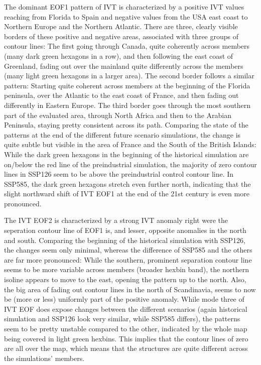 The dominant EOF1 pattern of IVT is characterized by a positive IVT values reaching from Florida to Spain and negative values from the USA east coast to Northern Europe and the Northern Atlantic. 
There are three, clearly visible borders of these positive and negative areas, associated with three groups of contour lines: The first going through Canada, quite coherently across members (many dark green hexagons in a row), and then following the east coast of Greenland, fading out over the mainland quite differently across the members (many light green hexagons in a larger area). 
The second border follows a similar pattern: Starting quite coherent across members at the beginning of the Florida peninsula, over the Atlantic to the east coast of France, and then fading out differently in Eastern Europe. 
The third border goes through the most southern part of the evaluated area, through North Africa and then to the Arabian Peninsula, staying pretty consistent across its path. 
Comparing the state of the patterns at the end of the different future scenario simulations, the change is quite subtle but visible in the area of France and the South of the British Islands:
While the dark green hexagons in the beginning of the historical simulation are on/below the red line of the preindustrial simulation, the majority of zero contour lines in SSP126 seem to be above the preindustrial control contour line. 
In SSP585, the dark green hexagons stretch even further north, indicating that the slight northward shift of IVT EOF1 at the end of the 21st century is even more pronounced. 

The IVT EOF2 is characterized by a strong IVT anomaly right were the seperation contour line of EOF1 is, and lesser, opposite anomalies in the north and south. 
Comparing the beginning of the historical simulation with SSP126, the changes seem only minimal, whereas the difference of SSP585 and the others are far more pronounced: 
While the southern, prominent separation contour line seems to be more variable across members (broader hexbin band), the northern isoline appears to move to the east, opening the pattern up to the north. 
Also, the big area of fading out contour lines in the north of Scandinavia, seems to now be (more or less) uniformly part of the positive anomaly.  
While mode three of IVT EOF does expose changes between the different scenarios (again historical simulation and SSP126 look very similar, while SSP585 differs), the patterns seem to be pretty unstable compared to the other, indicated by the whole map being covered in light green hexbins. 
This implies that the contour lines of zero are all over the map, which means that the structures are quite different across the simulations' members. 

